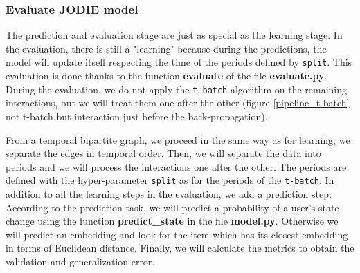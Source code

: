 \subsubsection{Evaluate JODIE model}

The prediction and evaluation stage are just as special as the learning stage. In the evaluation, there is still a "learning" because during the predictions, the model will update itself respecting the time of the periods defined by \texttt{split}. This evaluation is done thanks to the function \textbf{evaluate} of the file \textbf{evaluate.py}. During the evaluation, we do not apply the \texttt{t-batch} algorithm on the remaining interactions, but we will treat them one after the other (figure \ref{pipeline_t-batch} not t-batch but interaction just before the back-propagation).


From a temporal bipartite graph, we proceed in the same way as for learning, we separate the edges in temporal order. Then, we will separate the data into periods and we will process the interactions one after the other. The periods are defined with the hyper-parameter \texttt{split} as for the periods of the \texttt{t-batch}. In addition to all the learning steps in the evaluation, we add a prediction step. According to the prediction task, we will predict a probability of a user's state change using the function \textbf{predict\_state} in the file \textbf{model.py}. Otherwise we will predict an embedding and look for the item which has its closest embedding in terms of Euclidean distance. Finally, we will calculate the metrics to obtain the validation and generalization error.

